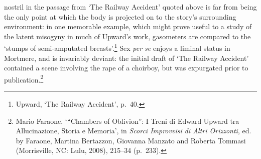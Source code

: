 \documentclass[]{article}
\begin{document}
nostril in the passage from ‘The Railway Accident’ quoted above is far
from being the only point at which the body is projected on to the
story’s surrounding environment: in one memorable example, which might
prove useful to a study of the latent misogyny in much of Upward’s work,
gasometers are compared to the ‘stumps of semi-amputated
breasts’.\footnote{Upward, ‘The Railway Accident’, p.~40.} Sex \emph{per
se} enjoys a liminal status in Mortmere, and is invariably deviant: the
initial draft of ‘The Railway Accident’ contained a scene involving the
rape of a choirboy, but was expurgated prior to publication.\footnote{Mario
  Faraone, ‘“Chambers of Oblivion”: I Treni di Edward Upward tra
  Allucinazione, Storia e Memoria’, in \emph{Scorci Improvvisi di Altri
  Orizzonti}, ed. by Faraone, Martina Bertazzon, Giovanna Manzato and
  Roberta Tommasi (Morrisville, NC: Lulu, 2008), 215–34 (p.~233).}
\end{document}
